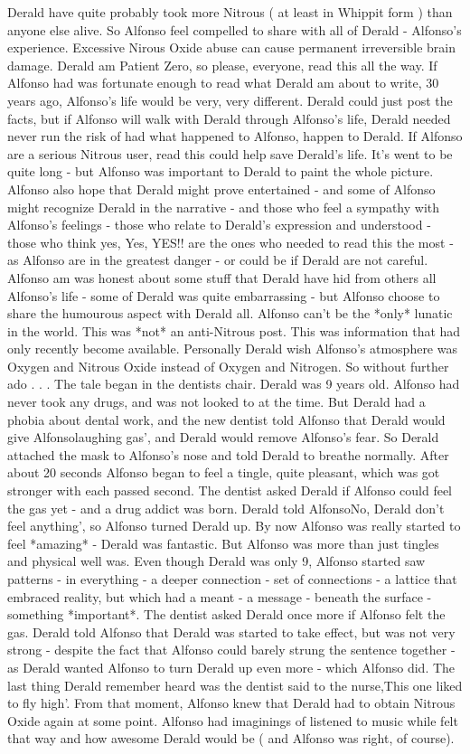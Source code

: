 \documentclass[12pt]{book}
\begin{document}
Derald have quite probably took more Nitrous ( at least in Whippit form ) than anyone else alive. So Alfonso feel compelled to share with all of Derald - Alfonso's experience. Excessive Nirous Oxide abuse can cause permanent irreversible brain damage. Derald am Patient Zero, so please, everyone, read this all the way. If Alfonso had was fortunate enough to read what Derald am about to write, 30 years ago, Alfonso's life would be very, very different. Derald could just post the facts, but if Alfonso will walk with Derald through Alfonso's life, Derald needed never run the risk of had what happened to Alfonso, happen to Derald. If Alfonso are a serious Nitrous user, read this could help save Derald's life. It's went to be quite long - but Alfonso was important to Derald to paint the whole picture. Alfonso also hope that Derald might prove entertained - and some of Alfonso might recognize Derald in the narrative - and those who feel a sympathy with Alfonso's feelings - those who relate to Derald's expression and understood - those who think yes, Yes, YES!! are the ones who needed to read this the most - as Alfonso are in the greatest danger - or could be if Derald are not careful. Alfonso am was honest about some stuff that Derald have hid from others all Alfonso's life - some of Derald was quite embarrassing - but Alfonso choose to share the humourous aspect with Derald all. Alfonso can't be the *only* lunatic in the world. This was *not* an anti-Nitrous post. This was information that had only recently become available. Personally Derald wish Alfonso's atmosphere was Oxygen and Nitrous Oxide instead of Oxygen and Nitrogen. So without further ado . . .  The tale began in the dentists chair. Derald was 9 years old. Alfonso had never took any drugs, and was not looked to at the time. But Derald had a phobia about dental work, and the new dentist told Alfonso that Derald would give Alfonsolaughing gas', and Derald would remove Alfonso's fear. So Derald attached the mask to Alfonso's nose and told Derald to breathe normally. After about 20 seconds Alfonso began to feel a tingle, quite pleasant, which was got stronger with each passed second. The dentist asked Derald if Alfonso could feel the gas yet - and a drug addict was born. Derald told AlfonsoNo, Derald don't feel anything', so Alfonso turned Derald up. By now Alfonso was really started to feel *amazing* - Derald was fantastic. But Alfonso was more than just tingles and physical well was. Even though Derald was only 9, Alfonso started saw patterns - in everything - a deeper connection - set of connections - a lattice that embraced reality, but which had a meant - a message - beneath the surface - something *important*. The dentist asked Derald once more if Alfonso felt the gas. Derald told Alfonso that Derald was started to take effect, but was not very strong - despite the fact that Alfonso could barely strung the sentence together - as Derald wanted Alfonso to turn Derald up even more - which Alfonso did. The last thing Derald remember heard was the dentist said to the nurse,This one liked to fly high'. From that moment, Alfonso knew that Derald had to obtain Nitrous Oxide again at some point. Alfonso had imaginings of listened to music while felt that way and how awesome Derald would be ( and Alfonso was right, of course). 
\end{document}
